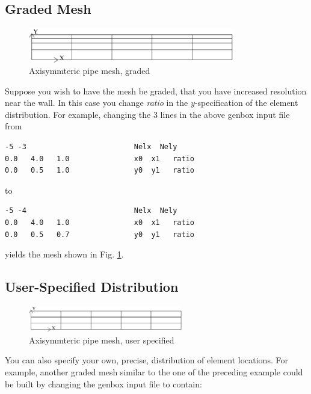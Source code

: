 \subsection{Graded Mesh}
\begin{figure}
\centering
\includegraphics[width=0.8\textwidth]{Figs/mesh_axi2}
\caption{Axisymmteric pipe mesh, graded}
\label{fig:mesh_axi2}
\end{figure}

Suppose you wish to have the mesh be graded,
that you have increased resolution near the wall.
In this case you change {\em ratio} in the $y$-specification
of the element distribution.  For example, changing the 3 lines
in the above genbox input file from

\begin{verbatim}
-5 -3                         Nelx  Nely
0.0   4.0   1.0               x0  x1   ratio
0.0   0.5   1.0               y0  y1   ratio
\end{verbatim}

\noindent
to

\begin{verbatim}
-5 -4                         Nelx  Nely
0.0   4.0   1.0               x0  x1   ratio
0.0   0.5   0.7               y0  y1   ratio
\end{verbatim}

\noindent
yields the mesh shown in Fig. \ref{fig:mesh_axi2}.


\subsection{User-Specified Distribution}
\begin{figure}
\centering
\includegraphics[width=0.6\textwidth]{Figs/mesh_axi1}
\caption{Axisymmteric pipe mesh, user specified}
\label{fig:mesh_axi1}
\end{figure}

You can also specify your own, precise, distribution of element
locations.   For example, another graded mesh similar to the
one of the preceding example could be built by changing the
genbox input file to contain:


